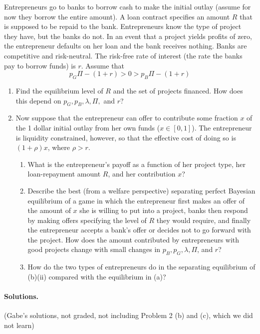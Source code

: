 \documentclass[12pt]{article}
\begin{document}
\begin{enumerate}
	Entrepreneurs go to banks to borrow cash to make the initial outlay (assume for now they borrow the entire amount). A loan contract specifies an amount $R$ that is supposed to be repaid to the bank. Entrepreneurs know the type of project they have, but the banks do not. In an event that a project yields profits of zero, the entrepreneur defaults on her loan and the bank receives nothing. Banks are competitive and risk-neutral. The risk-free rate of interest (the rate the banks pay to borrow funds) is $r$. Assume that
	\[
	p_G \Pi - (1 + r) > 0 > p_B \Pi - (1 + r)
	\]
	\begin{enumerate}
		\item Find the equilibrium level of $R$ and the set of projects financed. How does this depend on $p_G,p_B,\lambda,\Pi,$ and $r$?
		\item Now suppose that the entrepreneur can offer to contribute some fraction $x$ of the 1 dollar initial outlay from her own funds ($x \in [0,1]$). The entrepreneur is liquidity constrained, however, so that the effective cost of doing so is $(1 + \rho)x$, where $\rho > r$.
		\begin{enumerate}
			\item What is the entrepreneur's payoff as a function of her project type, her loan-repayment amount $R$, and her contribution $x$?
			\item Describe the best (from a welfare perspective) separating perfect Bayesian equilibrium of a game in which the entrepreneur first makes an offer of the amount of $x$ she is willing to put into a project, banks then respond by making offers specifying the level of $R$ they would require, and finally the entrepreneur accepts a bank's offer or decides not to go forward with the project. How does the amount contributed by entrepreneurs with good projects change with small changes in $p_B,p_G,\lambda,\Pi$, and $r$?
			\item How do the two types of entrepreneurs do in the separating equilibrium of (b)(ii) compared with the equilibrium in (a)?
		\end{enumerate}
	\end{enumerate}
\end{enumerate}


\paragraph{Solutions.} (Gabe's solutions, not graded, not including Problem 2 (b) and (c), which we did not learn)
\end{document}
